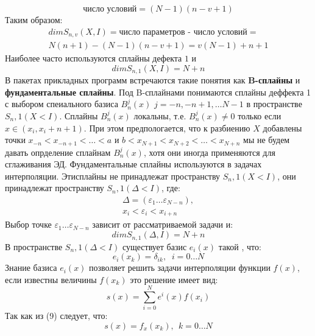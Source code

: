 \begin{equation}
\textit{число условий} = (N-1)(n-v+1)
\end{equation}
Таким образом:
\begin{equation}
\begin{aligned}dim S_{n,v}(X,I) = \textit{число параметров - число условий} =\\
 N(n+1)-(N-1)(n-v+1)=v(N-1)+n+1\end{aligned}
\end{equation}
Наиболее часто используются сплайны дефекта $1$ и
\begin{equation}
dim  S_{n,1}(X,I) = N+n
\end{equation}
В пакетах прикладных программ встречаются такие понятия как \textbf{B-сплайны} и \textbf{фундаментальные сплайны}. Под B-сплайнами понимаются сплайны деффекта 1 с выбором спеиального базиса $B_n^j(x)$ $j=-n,-n+1,\ldots N-1$ в пространстве $S_n,1(X<I)$. Сплайны $B_n^j(x)$ локальны, т.е.  $B_n^j(x)\neq 0$ только если $x\in(x_i,x_i+n+1)$. При этом предпологается, что к разбиению $X$ добавлены точки $x_{-n}<x_{-n+1}<\ldots<a$ и $b<x_{N+1}<x_{N+2}<\ldots<x_{N+n}$ мы не будем давать опрделение сплайнам $B_n^j(x)$, хотя они иногда применяются для сглаживания ЭД.
Фундаментальные сплайны используются в задачах интерполяции. Этисплайны не принадлежат пространству $S_n,1(X<I)$,  они принадлежат пространству $S_n,1(\Delta<I)$, где:
\begin{equation}
\begin{aligned}\Delta=(\varepsilon_1\ldots\varepsilon_{N-n}), \\
x_i<\varepsilon_i<x_{i+n}\end{aligned}
\end{equation}
Выбор точке $\varepsilon_1\ldots\varepsilon_{N-n}$ зависит от рассматриваемой задачи и:
\begin{equation}
dim  S_{n,1}(\Delta,I) = N+n
\end{equation}
В пространстве $S_n,1(\Delta<I)$ существует базис $e_i(x)$ такой , что:
\begin{equation}
e_i(x_k)=\delta_{ik},\;\; 	i=0\ldots N
\end{equation}
Знание базиса $e_i(x)$ позволяет решить задачи интерполяции функции $f(x)$, если известны величины $f(x_k)$ это решение имеет вид:
\begin{equation}
s\left( x\right) =\sum ^{N}_{i=0}e^{i}\left( x\right) f\left( x_{i}\right)
\end{equation}
Так как из (9) следует, что:
\begin{equation}
s\left( x\right) =f_{x}\left( x_{k}\right),\ \  k=0\ldots N
\end{equation}


